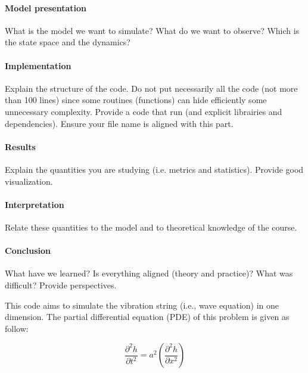

\paragraph{Model presentation}
What is the model we want to simulate? What do we want to observe? Which is the state space and the dynamics?

\paragraph{Implementation}
Explain the structure of the code. Do not put necessarily all the code (not more than 100 lines) since some routines (functions) can hide efficiently some unnecessary complexity. Provide a code that run (and explicit librairies and dependencies). Ensure your file name is aligned with this part.

 \paragraph{Results}
 Explain the quantities you are studying (i.e. metrics and statistics). Provide good visualization.
 
\paragraph{Interpretation}
Relate these quantities to the model and to theoretical knowledge of the course.

 \paragraph{Conclusion}
 What have we learned? Is everything aligned (theory and practice)? What was difficult? Provide perspectives.
 
This code aims to simulate the vibration string (i.e., wave equation) in one dimension. The partial differential equation (PDE) of this problem is given as follow:

\begin{equation}
\frac{\partial^2 h}{\partial t^2}=a^2\left(\frac{\partial^2 h}{\partial x^2}\right)
\end{equation}

